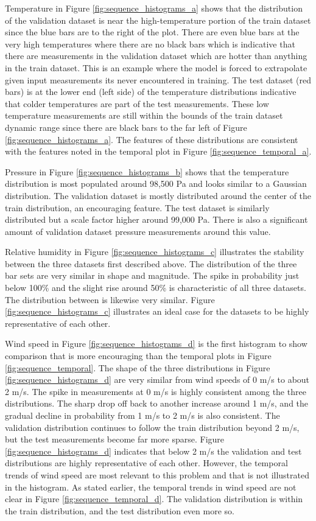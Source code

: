 Temperature in Figure \ref{fig:sequence_histograms_a} shows that the distribution of the validation dataset is near the high-temperature portion of the train dataset since the blue bars are to the right of the plot. There are even blue bars at the very high temperatures where there are no black bars which is indicative that there are measurements in the validation dataset which are hotter than anything in the train dataset. This is an example where the model is forced to extrapolate given input measurements its never encountered in training. The test dataset (red bars) is at the lower end (left side) of the temperature distributions indicative that colder temperatures are part of the test measurements. These low temperature measurements are still within the bounds of the train dataset dynamic range since there are black bars to the far left of Figure \ref{fig:sequence_histograms_a}. The features of these distributions are consistent with the features noted in the temporal plot in Figure \ref{fig:sequence_temporal_a}.

Pressure in Figure \ref{fig:sequence_histograms_b} shows that the temperature distribution is most populated around 98,500 Pa and looks similar to a Gaussian distribution. The validation dataset is mostly distributed around the center of the train distribution, an encouraging feature. The test dataset is similarly distributed but a scale factor higher around 99,000 Pa. There is also a significant amount of validation dataset pressure measurements around this value.

Relative humidity in Figure \ref{fig:sequence_histograms_c} illustrates the stability between the three datasets first described above. The distribution of the three bar sets are very similar in shape and magnitude. The spike in probability just below 100\% and the slight rise around 50\% is characteristic of all three datasets. The distribution between is likewise very similar. Figure \ref{fig:sequence_histograms_c} illustrates an ideal case for the datasets to be highly representative of each other.

Wind speed in Figure \ref{fig:sequence_histograms_d} is the first histogram to show comparison that is more encouraging than the temporal plots in Figure \ref{fig:sequence_temporal}. The shape of the three distributions in Figure \ref{fig:sequence_histograms_d} are very similar from wind speeds of 0 m/s to about 2 m/s. The spike in measurements at 0 m/s is highly consistent among the three distributions. The sharp drop off back to another increase around 1 m/s, and the gradual decline in probability from 1 m/s to 2 m/s is also consistent. The validation distribution continues to follow the train distribution beyond 2 m/s, but the test measurements become far more sparse. Figure \ref{fig:sequence_histograms_d} indicates that below 2 m/s the validation and test distributions are highly representative of each other. However, the temporal trends of wind speed are most relevant to this problem and that is not illustrated in the histogram. As stated earlier, the temporal trends in wind speed  are not clear in Figure \ref{fig:sequence_temporal_d}. The validation distribution is within the train distribution, and the test distribution even more so.

